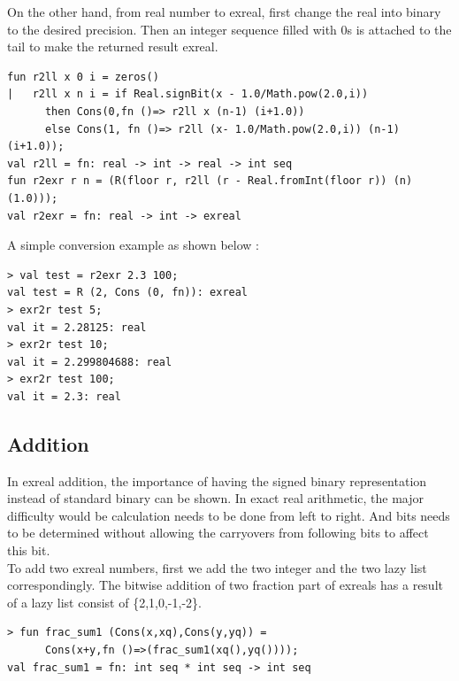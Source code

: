 \documentclass[12pt,twoside,notitlepage]{report}
\begin{document}
On the other hand, from real number to exreal, first change the real into binary to the desired precision. Then an integer sequence filled with 0s is attached to the tail to make the returned result exreal.

{
\begin{verbatim}
fun r2ll x 0 i = zeros()
|   r2ll x n i = if Real.signBit(x - 1.0/Math.pow(2.0,i)) 
      then Cons(0,fn ()=> r2ll x (n-1) (i+1.0))
      else Cons(1, fn ()=> r2ll (x- 1.0/Math.pow(2.0,i)) (n-1) (i+1.0)); 
val r2ll = fn: real -> int -> real -> int seq
fun r2exr r n = (R(floor r, r2ll (r - Real.fromInt(floor r)) (n) (1.0)));
val r2exr = fn: real -> int -> exreal
\end{verbatim}
}

A simple conversion example as shown below :
{
\begin{verbatim}
> val test = r2exr 2.3 100;
val test = R (2, Cons (0, fn)): exreal
> exr2r test 5;
val it = 2.28125: real
> exr2r test 10;
val it = 2.299804688: real
> exr2r test 100;
val it = 2.3: real
\end{verbatim}
}



 
\subsection{Addition}
In exreal addition, the importance of having the signed binary representation instead of standard binary can be shown. In exact real arithmetic, the major difficulty would be calculation needs to be done from left to right. And bits needs to be determined without allowing the carryovers from following bits to affect this bit.\\
To add two exreal numbers, first we add the two integer and the two lazy list correspondingly. The bitwise addition of two fraction part of exreals has a result of a lazy list consist of \{2,1,0,-1,-2\}.

{
\begin{verbatim}
> fun frac_sum1 (Cons(x,xq),Cons(y,yq)) = 
      Cons(x+y,fn ()=>(frac_sum1(xq(),yq())));
val frac_sum1 = fn: int seq * int seq -> int seq
\end{verbatim}
}
\end{document}
